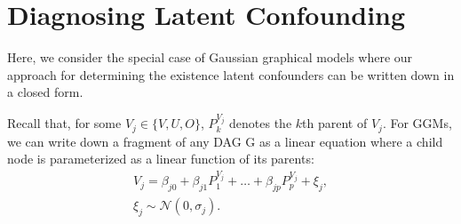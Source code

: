 \documentclass{article}
\begin{document}
\section{Diagnosing Latent Confounding}

Here, we consider the special case of Gaussian graphical models where our approach for determining the existence latent confounders can be written down in a closed form. 

Recall that, for some $V_j \in \{V, U, O\}$, $P^{V_j}_k$ denotes the $k$th parent of $V_j$.  For GGMs, we can write down a fragment of any DAG G as a linear equation where a child node is parameterized as a linear function of its parents:
\begin{equation}
\begin{align*}
V_j = \beta_{j0} + \beta_{j1} P^{V_j}_1 + \dots + \beta_{jp} P^{V_j}_p + \xi_j,\\\xi_j \sim \mathcal{N}(0, \sigma_j).
\end{align*}
\end{equation}	
\end{document}
